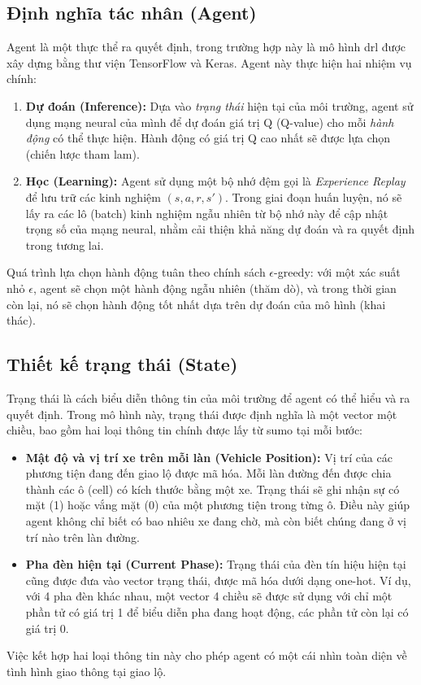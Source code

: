 \subsection{Định nghĩa tác nhân (Agent)}
Agent là một thực thể ra quyết định, trong trường hợp này là mô hình \ac{drl} được
xây dựng bằng thư viện TensorFlow và Keras. Agent này thực hiện hai nhiệm vụ
chính:
\begin{enumerate}
    \item \textbf{Dự đoán (Inference):} Dựa vào \textit{trạng thái} hiện tại của
        môi trường, agent sử dụng mạng neural của mình để dự đoán giá trị Q (Q-value)
        cho mỗi \textit{hành động} có thể thực hiện. Hành động có giá trị Q cao
        nhất sẽ được lựa chọn (chiến lược tham lam).

    \item \textbf{Học (Learning):} Agent sử dụng một bộ nhớ đệm gọi là \textit{Experience
        Replay} để lưu trữ các kinh nghiệm $(s, a, r, s')$. Trong giai đoạn huấn
        luyện, nó sẽ lấy ra các lô (batch) kinh nghiệm ngẫu nhiên từ bộ nhớ này để
        cập nhật trọng số của mạng neural, nhằm cải thiện khả năng dự đoán và ra
        quyết định trong tương lai.
\end{enumerate}
Quá trình lựa chọn hành động tuân theo chính sách $\epsilon$-greedy: với một xác
suất nhỏ $\epsilon$, agent sẽ chọn một hành động ngẫu nhiên (thăm dò), và trong
thời gian còn lại, nó sẽ chọn hành động tốt nhất dựa trên dự đoán của mô hình (khai
thác).

\subsection{Thiết kế trạng thái (State)}
Trạng thái là cách biểu diễn thông tin của môi trường để agent có thể hiểu và ra
quyết định. Trong mô hình này, trạng thái được định nghĩa là một vector một chiều,
bao gồm hai loại thông tin chính được lấy từ \ac{sumo} tại mỗi bước:
\begin{itemize}
    \item \textbf{Mật độ và vị trí xe trên mỗi làn (Vehicle Position):} Vị trí của các
        phương tiện đang đến giao lộ được mã hóa. Mỗi làn đường đến được chia thành
        các ô (cell) có kích thước bằng một xe. Trạng thái sẽ ghi nhận sự có mặt
        (1) hoặc vắng mặt (0) của một phương tiện trong từng ô. Điều này giúp agent
        không chỉ biết có bao nhiêu xe đang chờ, mà còn biết chúng đang ở vị trí
        nào trên làn đường.

    \item \textbf{Pha đèn hiện tại (Current Phase):} Trạng thái của đèn tín hiệu
        hiện tại cũng được đưa vào vector trạng thái, được mã hóa dưới dạng one-hot.
        Ví dụ, với 4 pha đèn khác nhau, một vector 4 chiều sẽ được sử dụng với
        chỉ một phần tử có giá trị 1 để biểu diễn pha đang hoạt động, các phần
        tử còn lại có giá trị 0.
\end{itemize}
Việc kết hợp hai loại thông tin này cho phép agent có một cái nhìn toàn diện về
tình hình giao thông tại giao lộ.

